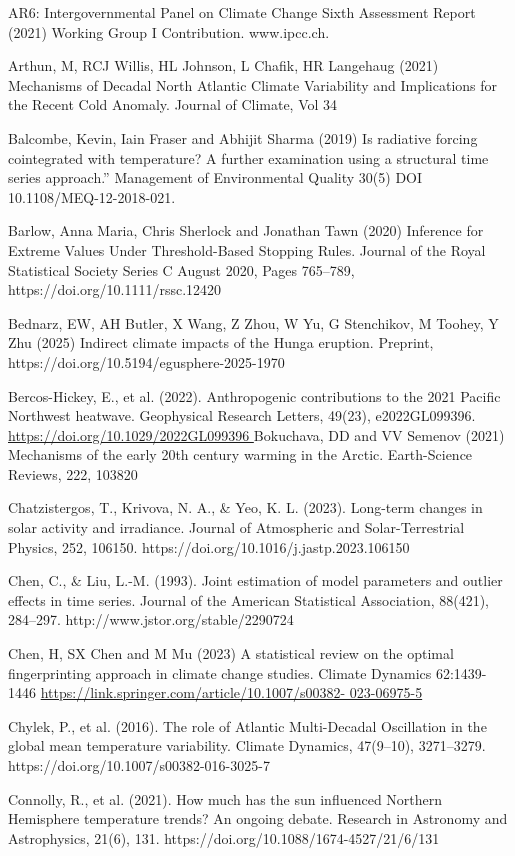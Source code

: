 \documentclass[12pt,paper=a4,DIV=12,parskip=never,chapterprefix=false,headings=standardclasses]{scrreprt}
\begin{document}
AR6: Intergovernmental Panel on Climate Change Sixth Assessment Report (2021) Working Group I
Contribution. www.ipcc.ch.

Arthun, M, RCJ Willis, HL Johnson, L Chafik, HR Langehaug (2021) Mechanisms of Decadal North
Atlantic Climate Variability and Implications for the Recent Cold Anomaly. Journal of Climate, Vol 34

Balcombe, Kevin, Iain Fraser and Abhijit Sharma (2019) Is radiative forcing cointegrated with temperature?
A further examination using a structural time series approach.” Management of Environmental Quality
30(5) DOI 10.1108/MEQ-12-2018-021.

Barlow, Anna Maria, Chris Sherlock and Jonathan Tawn (2020) Inference for Extreme Values Under
Threshold-Based Stopping Rules. Journal of the Royal Statistical Society Series C August 2020,
Pages 765–789, https://doi.org/10.1111/rssc.12420

Bednarz, EW, AH Butler, X Wang, Z Zhou, W Yu, G Stenchikov, M Toohey, Y Zhu (2025) Indirect
climate impacts of the Hunga eruption. Preprint, https://doi.org/10.5194/egusphere-2025-1970

Bercos-Hickey, E., et al. (2022). Anthropogenic contributions to the 2021 Pacific Northwest heatwave.
Geophysical Research Letters, 49(23), e2022GL099396. \url{https://doi.org/10.1029/2022GL099396
}
Bokuchava, DD and VV Semenov (2021) Mechanisms of the early 20th century warming in the Arctic.
Earth-Science Reviews, 222, 103820

Chatzistergos, T., Krivova, N. A., \& Yeo, K. L. (2023). Long-term changes in solar activity and
irradiance. Journal of Atmospheric and Solar-Terrestrial Physics, 252, 106150.
https://doi.org/10.1016/j.jastp.2023.106150

Chen, C., \& Liu, L.-M. (1993). Joint estimation of model parameters and outlier effects in time series.
Journal of the American Statistical Association, 88(421), 284–297.
http://www.jstor.org/stable/2290724

Chen, H, SX Chen and M Mu (2023) A statistical review on the optimal fingerprinting approach in climate
change studies. Climate Dynamics 62:1439-1446 \url{https://link.springer.com/article/10.1007/s00382-
023-06975-5}

Chylek, P., et al. (2016). The role of Atlantic Multi-Decadal Oscillation in the global mean temperature
variability. Climate Dynamics, 47(9–10), 3271–3279. https://doi.org/10.1007/s00382-016-3025-7

Connolly, R., et al. (2021). How much has the sun influenced Northern Hemisphere temperature trends?
An ongoing debate. Research in Astronomy and Astrophysics, 21(6), 131.
https://doi.org/10.1088/1674-4527/21/6/131
\end{document}

